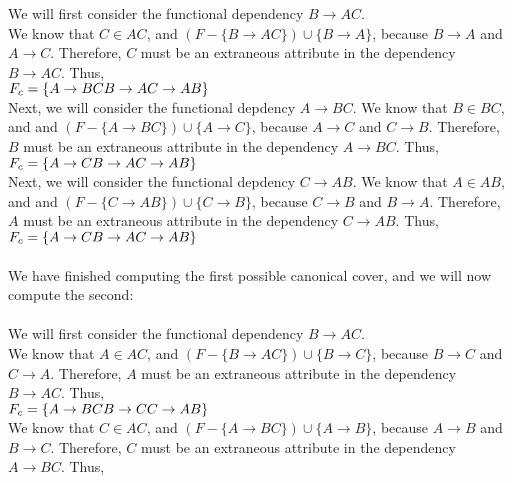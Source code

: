 \documentclass[a4 paper]{article}
\begin{document}
We will first consider the functional dependency $B\rightarrow AC$.\\
We know that $C\in AC$, and $(F-\{B\rightarrow AC\})\cup\{B\rightarrow A\}$, because $B\rightarrow A$ and $A\rightarrow C$. Therefore, $C$ must be an extraneous attribute in the dependency $B\rightarrow AC$. Thus,\\
$F_c=\{\\
A\rightarrow BC\\
B\rightarrow A\\
C\rightarrow AB\}$\\
Next, we will consider the functional depdency $A\rightarrow BC$. We know that $B\in BC$, and and $(F-\{A\rightarrow BC\})\cup\{A\rightarrow C\}$, because $A\rightarrow C$ and $C\rightarrow B$. Therefore, $B$ must be an extraneous attribute in the dependency $A\rightarrow BC$. Thus,\\
$F_c=\{\\
A\rightarrow C\\
B\rightarrow A\\
C\rightarrow AB\}$\\
Next, we will consider the functional depdency $C\rightarrow AB$. We know that $A\in AB$, and and $(F-\{C\rightarrow AB\})\cup\{C\rightarrow B\}$, because $C\rightarrow B$ and $B\rightarrow A$. Therefore, $A$ must be an extraneous attribute in the dependency $C\rightarrow AB$. Thus,\\
$F_c=\{\\
A\rightarrow C\\
B\rightarrow A\\
C\rightarrow AB\}$\\\\
We have finished computing the first possible canonical cover, and we will now compute the second:\\\\
We will first consider the functional dependency $B\rightarrow AC$.\\
We know that $A\in AC$, and $(F-\{B\rightarrow AC\})\cup\{B\rightarrow C\}$, because $B\rightarrow C$ and $C\rightarrow A$. Therefore, $A$ must be an extraneous attribute in the dependency $B\rightarrow AC$. Thus,\\
$F_c=\{\\
A\rightarrow BC\\
B\rightarrow C\\
C\rightarrow AB\}$\\
We know that $C\in AC$, and $(F-\{A\rightarrow BC\})\cup\{A\rightarrow B\}$, because $A\rightarrow B$ and $B\rightarrow C$. Therefore, $C$ must be an extraneous attribute in the dependency $A\rightarrow BC$. Thus,\\
\end{document}

